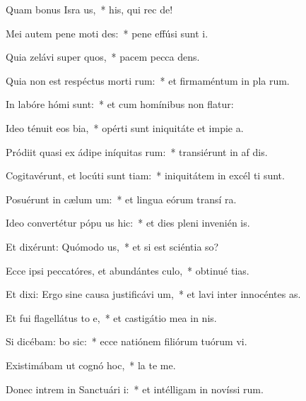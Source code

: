 \item Quam bonus Isra us,~* his, qui rec  de!
\item Mei autem pene moti  des:~* pene effúsi sunt  i.
\item Quia zelávi super quos,~* pacem pecca dens.
\item Quia non est respéctus morti rum:~* et firmaméntum in pla rum.
\item In labóre hómi  sunt:~* et cum homínibus non flatur:
\item Ideo ténuit eos bia,~* opérti sunt iniquitáte et impie a.
\item Pródiit quasi ex ádipe iníquitas rum:~* transiérunt in af dis.
\item Cogitavérunt, et locúti sunt tiam:~* iniquitátem in excél ti sunt.
\item Posuérunt in cælum  um:~* et lingua eórum transí  ra.
\item Ideo convertétur pópu us hic:~* et dies pleni invenién  is.
\item Et dixérunt: Quómodo  us,~* et si est sciéntia  so?
\item Ecce ipsi peccatóres, et abundántes  culo,~* obtinué tias.
\item Et dixi: Ergo sine causa justificávi  um,~* et lavi inter innocéntes  as.
\item Et fui flagellátus to e,~* et castigátio mea in nis.
\item Si dicébam: bo sic:~* ecce natiónem filiórum tuórum vi.
\item Existimábam ut cognó hoc,~* la  te me.
\item Donec intrem in Sanctuári i:~* et intélligam in novíssi rum.
